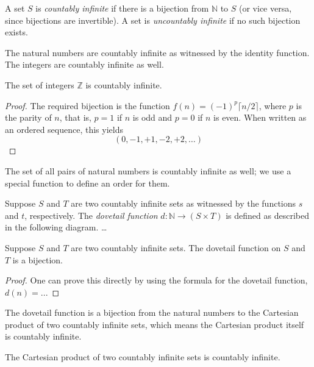 \begin{definition}
  A set $S$ is \emph{countably infinite} if there is a bijection from $\mathbb{N}$ to $S$ (or vice versa, since bijections are invertible).
  A set is \emph{uncountably infinite} if no such bijection exists.
\end{definition}

The natural numbers are countably infinite as witnessed by the identity function.
The integers are countably infinite as well.

\begin{theorem}
  The set of integers $\mathbb{Z}$ is countably infinite.
\end{theorem}
\begin{proof}
  The required bijection is the function $f(n) = (-1)^{p} \lceil n / 2 \rceil$, where $p$ is the parity of $n$, that is, $p = 1$ if $n$ is odd and $p = 0$ if $n$ is even.
  When written as an ordered sequence, this yields
  $$
  (0, -1, +1, -2, +2, \dotsc)
  $$
\end{proof}

The set of all pairs of natural numbers is countably infinite as well; we use a special function to define an order for them.

\begin{definition}
  Suppose $S$ and $T$ are two countably infinite sets as witnessed by the functions $s$ and $t$, respectively.
  The \emph{dovetail function} $d \colon \mathbb{N} \to (S \times T)$ is defined as described in the following diagram.
  \ldots
\end{definition}

\begin{lemma}
  Suppose $S$ and $T$ are two countably infinite sets.
  The dovetail function on $S$ and $T$ is a bijection.
\end{lemma}
\begin{proof}
  One can prove this directly by using the formula for the dovetail function, $d(n) = ...$
\end{proof}

The dovetail function is a bijection from the natural numbers to the Cartesian product of two countably infinite sets, which means the Cartesian product itself is countably infinite.

\begin{theorem}
  The Cartesian product of two countably infinite sets is countably infinite.
\end{theorem}

